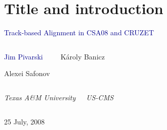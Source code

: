 \documentclass[compress]{beamer}
\begin{document}
\section*{Title and introduction}

\begin{frame}
\vfill
\begin{center}
\textcolor{darkblue}{\Large Track-based Alignment in CSA08 and CRUZET}

\vfill
\begin{columns}
\begin{center}
\large
\textcolor{darkblue}{Jim Pivarski}

\vspace{0.2 cm}
Alexei Safonov
\end{center}

\begin{center}
\large
K\'aroly Banicz
\end{center}
\end{columns}

\begin{columns}
\begin{center}
\scriptsize
{\it Texas A\&M University}
\end{center}
\begin{center}
\scriptsize
{\it US-CMS}
\end{center}
\end{columns}

\vfill
25 July, 2008

\end{center}
\end{frame}

\end{document}
